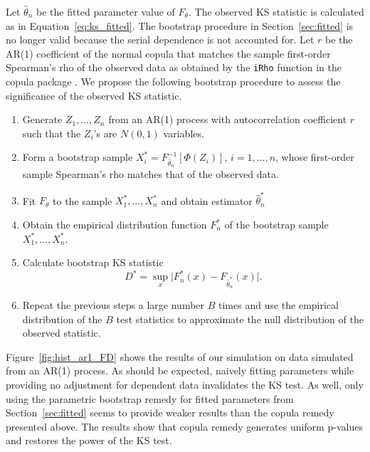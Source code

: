 \documentclass[12pt, letterpaper, titlepage]{article}
\begin{document}
Let $\hat\theta_n$ be the fitted parameter value of $F_{\theta}$. The observed
KS statistic is calculated as in Equation~\eqref{eq:ks_fitted}. The bootstrap
procedure in Section~\ref{sec:fitted} is no longer valid because the serial
dependence is not accounted for. Let $r$ be the AR(1) coefficient of the normal 
copula that matches the sample first-order Spearman's rho of the observed data 
as obtained by the \texttt{iRho} function in the \textsf{copula} package 
\citep{Copula}. We propose the following bootstrap procedure to assess the 
significance of the observed KS statistic.
\begin{enumerate}
\item
  Generate $Z_1, \ldots, Z_n$ from an AR(1) process with autocorrelation
  coefficient $r$ such that the $Z_i$'s are $N(0, 1)$ variables.
\item
  Form a bootstrap sample $X_i^* = F^{-1}_{\hat\theta_n} [\Phi(Z_i)]$,
  $i = 1, \ldots, n$, whose first-order sample Spearman's rho matches that of
  the observed data.
\item
  Fit $F_\theta$ to the sample $X_1^*, \ldots, X_n^*$ and obtain estimator 
  $\hat\theta_n^*$
\item
  Obtain the empirical distribution function $F_n^*$ of the bootstrap sample
  $X_1^*, \ldots, X_n^*$.
\item 
  Calculate bootstrap KS statistic
  \[
    D^* = \sup_x \lvert F_n^* (x)- F_{\hat\theta_n^*}(x) \rvert.
  \]
\item
  Repeat the previous steps a large number $B$ times and use the empirical
    distribution of the $B$ test statistics to approximate
    the null distribution of the observed statistic.      
\end{enumerate}

Figure~\ref{fig:hist_ar1_FD} shows the results of our simulation on data 
simulated from an AR(1) process. As should be expected, naively fitting 
parameters while providing no adjustment for dependent data invalidates the KS 
test. As well, only using the parametric bootstrap remedy for fitted parameters 
from Section~\ref{sec:fitted} seems to provide weaker results than the 
copula remedy presented above. The results show that copula remedy generates 
uniform p-values and restores the power of the KS test.
\end{document}
